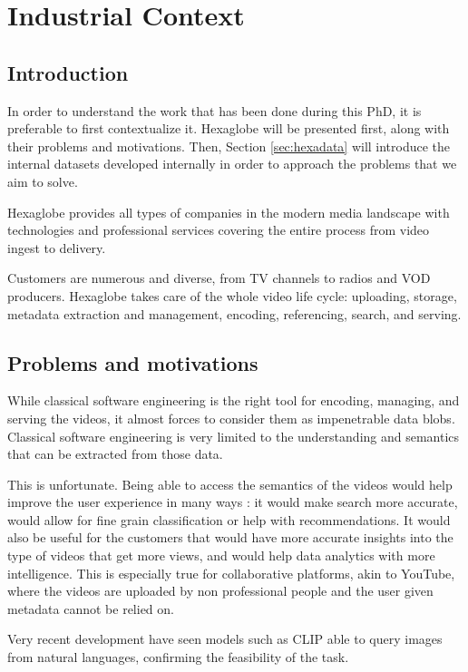 \chapter{Industrial Context}
\label{chap:hexa}

\section{Introduction}

In order to understand the work that has been done during this PhD, it is preferable to first contextualize it. Hexaglobe will be presented first, along with their problems and motivations. Then, Section \ref{sec:hexadata} will introduce the internal datasets developed internally in order to approach the problems that we aim to solve. 

Hexaglobe provides all types of companies in the modern media landscape with technologies and professional services covering the entire process from video ingest to delivery.

Customers are numerous and diverse, from TV channels to radios and \ac{VOD} producers. Hexaglobe takes care of the whole video life cycle: uploading, storage, metadata extraction and management, encoding, referencing, search, and serving.

\section{Problems and motivations}

While classical software engineering is the right tool for encoding, managing, and serving the videos, it almost forces to consider them as impenetrable data blobs. Classical software engineering is very limited to the understanding and semantics that can be extracted from those data.

This is unfortunate. Being able to access the semantics of the videos would help improve the user experience in many ways \citep{contentretrieval}: it would make search more accurate, would allow for fine grain classification or help with recommendations. It would also be useful for the customers that would have more accurate insights into the type of videos that get more views, and would help data analytics with more intelligence. This is especially true for collaborative platforms, akin to YouTube, where the videos are uploaded by non professional people and the user given metadata cannot be relied on.

Very recent development have seen models such as \ac{CLIP} \citep{openaiclip} able to query images from natural languages, confirming the feasibility of the task.

